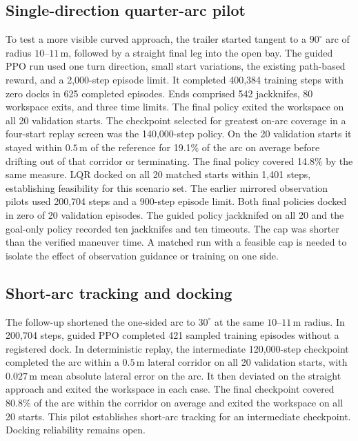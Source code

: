 \documentclass[conference]{IEEEtran}
\begin{document}
\subsection{Single-direction quarter-arc pilot}
To test a more visible curved approach, the trailer started tangent to
a $90^\circ$ arc of radius $10$--$11\,\mathrm{m}$, followed by a straight
final leg into the open bay. The guided PPO run used one turn direction,
small start variations, the existing path-based reward, and a 2,000-step
episode limit. It completed 400,384 training steps with zero docks in
625 completed episodes. Ends comprised 542 jackknifes, 80 workspace exits,
and three time limits. The final policy exited the workspace on all 20
validation starts. The checkpoint selected for greatest on-arc coverage
in a four-start replay screen was the 140,000-step policy. On the 20
validation starts it stayed within $0.5\,\mathrm{m}$ of the reference for
19.1\% of the arc on average before drifting out of that corridor or
terminating. The final policy covered 14.8\% by the same measure.
LQR docked on all 20 matched starts within 1,401 steps, establishing
feasibility for this scenario set.
The earlier mirrored observation pilots used 200,704 steps and a
900-step episode limit. Both final policies docked in zero of 20
validation episodes. The guided policy jackknifed on all 20 and the
goal-only policy recorded ten jackknifes and ten timeouts. The cap
was shorter than the verified maneuver time. A matched run with a
feasible cap is needed to isolate the effect of observation guidance
or training on one side.

\subsection{Short-arc tracking and docking}
The follow-up shortened the one-sided arc to $30^\circ$ at the same
$10$--$11\,\mathrm{m}$ radius. In 200,704 steps, guided PPO completed 421
sampled training episodes without a registered dock. In deterministic replay,
the intermediate 120,000-step checkpoint completed the arc within a
$0.5\,\mathrm{m}$ lateral corridor on all 20 validation starts, with
$0.027\,\mathrm{m}$ mean absolute lateral error on the arc. It then
deviated on the straight approach and exited the workspace in each case.
The final checkpoint covered 80.8\% of the arc within the corridor on
average and exited the workspace on all 20 starts. This pilot establishes
short-arc tracking for an intermediate checkpoint. Docking reliability
remains open.
\end{document}
